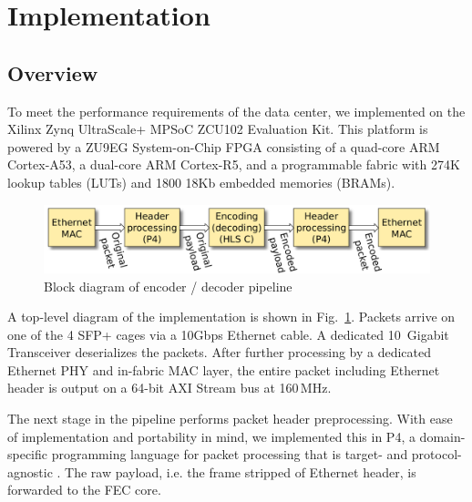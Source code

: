 \section{Implementation}
\label{sec:implementation}

\newcommand{\leicom}[1]{{\color{blue}{[\textbf{Lei Comment:} #1]}}}
\newcommand{\hg}[1]{{\color{green}{[\textbf{Hans Comment:} #1]}}}

\subsection{Overview}

To meet the performance requirements of the data center, we implemented \OurSys
on the Xilinx Zynq UltraScale+ MPSoC ZCU102 Evaluation Kit.  This platform is
powered by a ZU9EG System-on-Chip FPGA consisting of a quad-core ARM Cortex-A53, a
dual-core ARM Cortex-R5, and a programmable fabric with 274K lookup tables
(LUTs) and 1800 18Kb embedded memories (BRAMs).

\begin{figure}
  \centering
  \includegraphics[width=0.4\paperwidth]{Top_level.pdf}
  \caption{\label{fig:toplevel} Block diagram of encoder / decoder pipeline}
\end{figure}

A top-level diagram of the implementation is shown in Fig.~\ref{fig:toplevel}.
Packets arrive on one of the 4 SFP+ cages via a 10Gbps Ethernet cable.
A dedicated 10~Gigabit Transceiver deserializes the packets.  After further
processing by a dedicated Ethernet PHY and in-fabric MAC layer, the entire
packet including Ethernet header is output on a 64-bit AXI Stream bus at 160\,MHz.

The next stage in the pipeline performs packet header preprocessing.  With
ease of implementation and portability in mind, we implemented this in P4, a
domain-specific programming language for packet processing that is target- and
protocol-agnostic \cite{p4_sigcomm_review2014}.  The raw payload, i.e. the frame stripped of Ethernet
header, is forwarded to the FEC core.  

